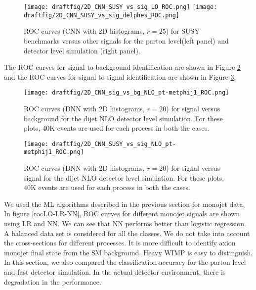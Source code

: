 \documentclass[aps,onecolumn,showpacs,superscriptaddress,groupedaddress,nofootinbib,preprint]{revtex4-1}
\begin{document}
\begin{figure}%
\centering
\texttt{[image: draftfig/2D\_CNN\_SUSY\_vs\_sig\_LO\_ROC.png]}
\texttt{[image: draftfig/2D\_CNN\_SUSY\_vs\_sig\_delphes\_ROC.png]}
\caption{ROC curves (CNN with 2D histograms, $r = 25$) for SUSY benchmarks versus other signals for the parton level(left panel) and detector level simulation (right panel).}\label{2D_CNN_SUSY_vs_sig_LO_ROC}
\end{figure}

The ROC curves for signal to background identification are shown in Figure \ref{2D_CNN_sig_vs_bg_NLO_ROC} and the ROC curves for signal to signal identification are shown in Figure \ref{2D_CNN_sig_vs_sig_NLO_ROC}.

\begin{figure}%
\centering
\texttt{[image: draftfig/2D\_CNN\_sig\_vs\_bg\_NLO\_pt-metphij1\_ROC.png]}
\caption{ROC curves (DNN with 2D histograms, $r = 20$) for signal versus background for the dijet NLO detector level simulation. For these plots, 40K events are used for each process in both the cases.}\label{2D_CNN_sig_vs_bg_NLO_ROC}
\end{figure}

\begin{figure}%
\centering
\texttt{[image: draftfig/2D\_CNN\_SUSY\_vs\_sig\_NLO\_pt-metphij1\_ROC.png]}
\caption{ROC curves (DNN with 2D histograms, $r = 20$) for signal versus signal for the dijet NLO detector level simulation. For these plots, 40K events are used for each process in both the cases.}\label{2D_CNN_sig_vs_sig_NLO_ROC}
\end{figure}



We used the ML algorithms described in the previous section for monojet data. In figure \ref{rocLO-LR-NN}, ROC 
curves for different monojet signals are shown using LR and NN.
We can see that NN performs better than logistic regression. A balanced data set is considered for all the 
classes. We do not take into account the cross-sections for different processes.
It is more difficult to identify axion monojet final state from the SM background. Heavy WIMP is easy to distinguish. In this section, we also compared the 
classification accuracy for the parton level and fast detector simulation. In the actual detector environment, there is degradation in the performance.
\end{document}
